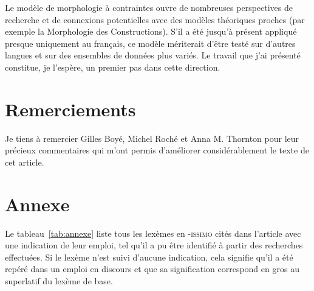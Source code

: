 \documentclass[output=paper]{langsci/langscibook}
\begin{document}
Le modèle de morphologie à contraintes ouvre de nombreuses perspectives
de recherche et de connexions potentielles avec des modèles théoriques
proches (par exemple la Morphologie des Constructions). S'il a été
jusqu'à présent appliqué presque uniquement au français, ce modèle
mériterait d'être testé sur d'autres langues et sur des ensembles de
données plus variés. Le travail que j'ai présenté constitue, je
l'espère, un premier pas dans cette direction.

\section*{Remerciements}

Je tiens à remercier Gilles Boyé,
  Michel Roché et Anna M. Thornton pour leur précieux commentaires qui
  m'ont permis d'améliorer considérablement le texte de cet article.




\section*{Annexe}

Le tableau~\ref{tab:annexe} liste tous les lexèmes en -\textsc{issimo} cités dans
l'article avec une indication de leur emploi, tel qu'il a pu être
identifié à partir des recherches effectuées. Si le lexème n'est suivi
d'aucune indication, cela signifie qu'il a été repéré dans un emploi en
discours et que sa signification correspond en gros au superlatif du
lexème de base.
\end{document}
